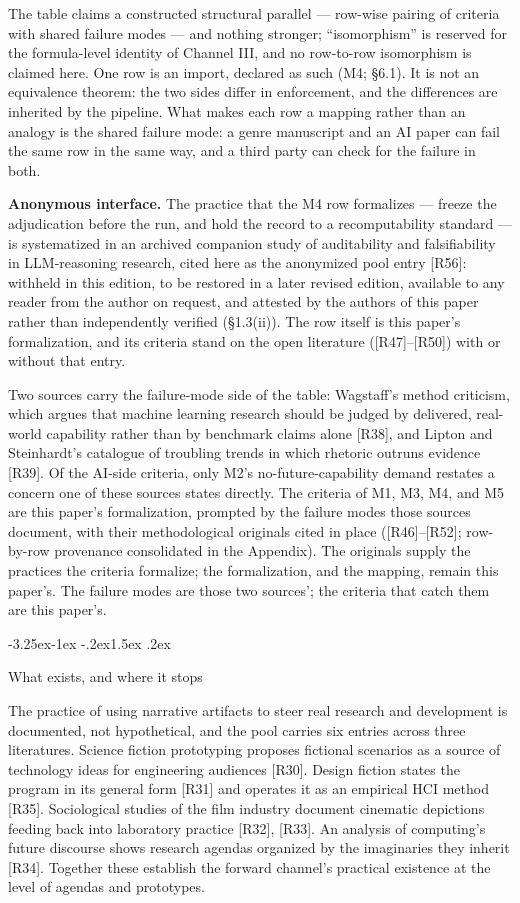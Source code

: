 \documentclass[11pt,a4paper]{article}
\makeatletter
\renewcommand\subsection{\@startsection{subsection}{2}{\z@}%
  {-3.25ex\@plus -1ex \@minus -.2ex}{1.5ex \@plus .2ex}%
  {\normalfont\large\bfseries\raggedright}}
\makeatother
\begin{document}
The table claims a constructed structural parallel — row-wise pairing of criteria with shared failure modes — and nothing stronger; ``isomorphism'' is reserved for the formula-level identity of Channel III, and no row-to-row isomorphism is claimed here. One row is an import, declared as such (M4; §6.1). It is not an equivalence theorem: the two sides differ in enforcement, and the differences are inherited by the pipeline. What makes each row a mapping rather than an analogy is the shared failure mode: a genre manuscript and an AI paper can fail the same row in the same way, and a third party can check for the failure in both.

\textbf{Anonymous interface.} The practice that the M4 row formalizes — freeze the adjudication before the run, and hold the record to a recomputability standard — is systematized in an archived companion study of auditability and falsifiability in LLM-reasoning research, cited here as the anonymized pool entry [R56]: withheld in this edition, to be restored in a later revised edition, available to any reader from the author on request, and attested by the authors of this paper rather than independently verified (§1.3(ii)). The row itself is this paper's formalization, and its criteria stand on the open literature ([R47]–[R50]) with or without that entry.

Two sources carry the failure-mode side of the table: Wagstaff's method criticism, which argues that machine learning research should be judged by delivered, real-world capability rather than by benchmark claims alone [R38], and Lipton and Steinhardt's catalogue of troubling trends in which rhetoric outruns evidence [R39]. Of the AI-side criteria, only M2's no-future-capability demand restates a concern one of these sources states directly. The criteria of M1, M3, M4, and M5 are this paper's formalization, prompted by the failure modes those sources document, with their methodological originals cited in place ([R46]–[R52]; row-by-row provenance consolidated in the Appendix). The originals supply the practices the criteria formalize; the formalization, and the mapping, remain this paper's. The failure modes are those two sources'; the criteria that catch them are this paper's.

\subsection{What exists, and where it stops}

The practice of using narrative artifacts to steer real research and development is documented, not hypothetical, and the pool carries six entries across three literatures. Science fiction prototyping proposes fictional scenarios as a source of technology ideas for engineering audiences [R30]. Design fiction states the program in its general form [R31] and operates it as an empirical HCI method [R35]. Sociological studies of the film industry document cinematic depictions feeding back into laboratory practice [R32], [R33]. An analysis of computing's future discourse shows research agendas organized by the imaginaries they inherit [R34]. Together these establish the forward channel's practical existence at the level of agendas and prototypes.
\end{document}
